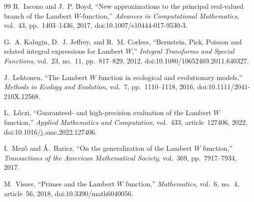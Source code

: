 \documentclass[11pt]{article}
\theoremstyle{remark}
\begin{document}
\begin{thebibliography}{99}
R.~Iacono and J.~P. Boyd,
``New approximations to the principal real-valued branch of the Lambert
\(W\)-function,''
\emph{Advances in Computational Mathematics}, vol.~43, pp.~1403--1436,
2017, doi:10.1007/s10444-017-9530-3.

G.~A. Kalugin, D.~J. Jeffrey, and R.~M. Corless,
``Bernstein, Pick, Poisson and related integral expressions for Lambert
\(W\),''
\emph{Integral Transforms and Special Functions}, vol.~23, no.~11,
pp.~817--829, 2012, doi:10.1080/10652469.2011.640327.

J.~Lehtonen,
``The Lambert \(W\) function in ecological and evolutionary models,''
\emph{Methods in Ecology and Evolution}, vol.~7, pp.~1110--1118, 2016,
doi:10.1111/2041-210X.12568.

L.~L\H{o}czi,
``Guaranteed- and high-precision evaluation of the Lambert \(W\) function,''
\emph{Applied Mathematics and Computation}, vol.~433, article~127406, 2022,
doi:10.1016/j.amc.2022.127406.

I.~Mez\H{o} and \'A.~Baricz,
``On the generalization of the Lambert \(W\) function,''
\emph{Transactions of the American Mathematical Society}, vol.~369,
pp.~7917--7934, 2017.

M.~Visser,
``Primes and the Lambert \(W\) function,''
\emph{Mathematics}, vol.~6, no.~4, article~56, 2018,
doi:10.3390/math6040056.

\end{thebibliography}
\end{document}
